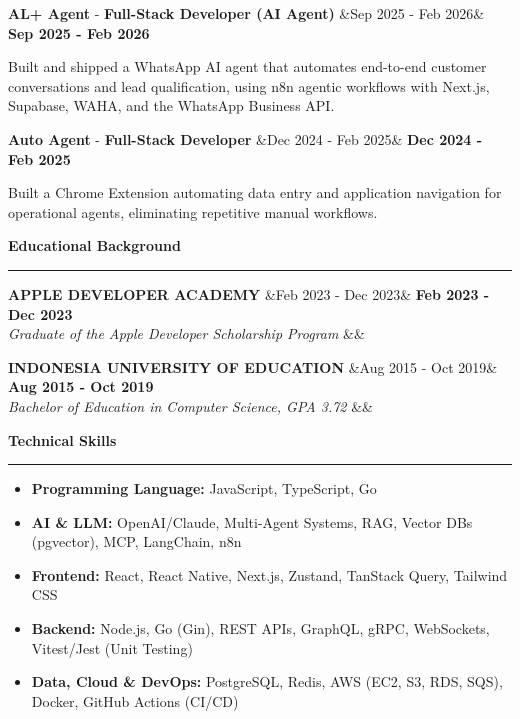 \documentclass{article}
\newcommand{\header}[1]{
	\vspace{2.5mm}
	{\large \noindent \textcolor[HTML]{19598C}{\textbf{#1}}}
	\vspace{0.5mm}
	\hrule
	\vspace{1.5mm}
}
\newcommand{\skillsheader}[1]{
	\vspace{2mm}
	{\large \noindent \textcolor[HTML]{19598C}{\textbf{#1}}}
	\vspace{1.5mm}
	\hrule
	\vspace{1.5mm}
}
\newcommand{\shortitem}[4]{
	\begin{adjustwidth}{}{}
		\textbf{#1} \hfill \ifx&#2& \else \textbf{#2} \fi \\
		\textit{#3} \ifx&#4& \else \hfill #4 \fi
	\end{adjustwidth}
	\vspace{1mm}
}
\newcommand{\projectitem}[4]{
	\begin{adjustwidth}{}{}
		\textbf{#1} - \textbf{#3} \hfill \ifx&#2& \else \textbf{#2} \fi \\
	\end{adjustwidth}
	\vspace{-1mm}
}
\newcommand{\textstart}{\begin{adjustwidth}{}{}\vspace{-4mm}}
\newcommand{\textend}{\end{adjustwidth}\vspace{0.2mm}}
\begin{document}
		\projectitem{AL+ Agent}{Sep 2025 - Feb 2026}{Full-Stack Developer (AI Agent)}{}
		\textstart
			Built and shipped a WhatsApp AI agent that automates end-to-end customer conversations and lead qualification, using n8n agentic workflows with Next.js, Supabase, WAHA, and the WhatsApp Business API.
		\textend

		\projectitem{Auto Agent}{Dec 2024 - Feb 2025}{Full-Stack Developer}{}
		\textstart
			Built a Chrome Extension automating data entry and application navigation for operational agents, eliminating repetitive manual workflows.
		\textend

	\header{Educational Background}
	\shortitem{\MakeUppercase{Apple Developer Academy}}{Feb 2023 - Dec 2023}{Graduate of the Apple Developer Scholarship Program}{}
	\shortitem{\MakeUppercase{Indonesia University of Education}}{Aug 2015 - Oct 2019}{Bachelor of Education in Computer Science, GPA 3.72}{}

	\skillsheader{Technical Skills}
	\vspace{-2mm}
	\begin{itemize}[leftmargin=*]
		\item \textbf{Programming Language:} JavaScript, TypeScript, Go
		\item \textbf{AI \& LLM:} OpenAI/Claude, Multi-Agent Systems, RAG, Vector DBs (pgvector), MCP, LangChain, n8n
		\item \textbf{Frontend:} React, React Native, Next.js, Zustand, TanStack Query, Tailwind CSS
		\item \textbf{Backend:} Node.js, Go (Gin), REST APIs, GraphQL, gRPC, WebSockets, Vitest/Jest (Unit Testing)
		\item \textbf{Data, Cloud \& DevOps:} PostgreSQL, Redis, AWS (EC2, S3, RDS, SQS), Docker, GitHub Actions (CI/CD)
	\end{itemize}
\end{document}
